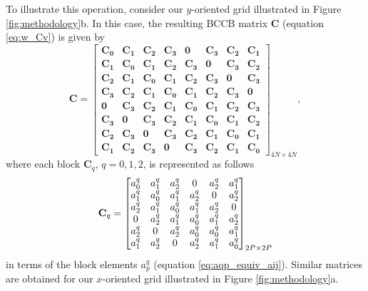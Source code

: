 To illustrate this operation, consider our $y$-oriented grid illustrated in Figure \ref{fig:methodology}b. 
In this case, the resulting 
BCCB matrix $\mathbf{C}$ (equation \ref{eq:w_Cv}) is given by 
\begin{equation}
\mathbf{C} =
\begin{bmatrix}
	\mathbf{C_{0}} & \mathbf{C_{1}} & \mathbf{C_{2}} & \mathbf{C_{3}} & \mathbf{0}     & \mathbf{C_{3}} & \mathbf{C_{2}} & \mathbf{C_{1}} \\
	\mathbf{C_{1}} & \mathbf{C_{0}} & \mathbf{C_{1}} & \mathbf{C_{2}} & \mathbf{C_{3}} & \mathbf{0}     & \mathbf{C_{3}} & \mathbf{C_{2}} \\
	\mathbf{C_{2}} & \mathbf{C_{1}} & \mathbf{C_{0}} & \mathbf{C_{1}} & \mathbf{C_{2}} & \mathbf{C_{3}} & \mathbf{0}     & \mathbf{C_{3}} \\
	\mathbf{C_{3}} & \mathbf{C_{2}} & \mathbf{C_{1}} & \mathbf{C_{0}} & \mathbf{C_{1}} & \mathbf{C_{2}} & \mathbf{C_{3}} & \mathbf{0}     \\
	\mathbf{0}     & \mathbf{C_{3}} & \mathbf{C_{2}} & \mathbf{C_{1}} & \mathbf{C_{0}} & \mathbf{C_{1}} & \mathbf{C_{2}} & \mathbf{C_{3}} \\
	\mathbf{C_{3}} & \mathbf{0}     & \mathbf{C_{3}} & \mathbf{C_{2}} & \mathbf{C_{1}} & \mathbf{C_{0}} & \mathbf{C_{1}} & \mathbf{C_{2}} \\
	\mathbf{C_{2}} & \mathbf{C_{3}} & \mathbf{0}     & \mathbf{C_{3}} & \mathbf{C_{2}} & \mathbf{C_{1}} & \mathbf{C_{0}} & \mathbf{C_{1}} \\
	\mathbf{C_{1}} & \mathbf{C_{2}} & \mathbf{C_{3}} & \mathbf{0}     & \mathbf{C_{3}} & \mathbf{C_{2}} & \mathbf{C_{1}} & \mathbf{C_{0}}
\end{bmatrix}_{4N \times 4N},
\label{eq:C-y-oriented}
\end{equation}
where each block $\mathbf{C}_{q}$, $q = 0, 1, 2$, is represented as follows 
\begin{equation}
\tensor{C}_{q} =
\begin{bmatrix}
	a^{q}_{0} & a^{q}_{1} & a^{q}_{2} & 0         & a^{q}_{2} & a^{q}_{1} \\
	a^{q}_{1} & a^{q}_{0} & a^{q}_{1} & a^{q}_{2} & 0         & a^{q}_{2} \\
	a^{q}_{2} & a^{q}_{1} & a^{q}_{0} & a^{q}_{1} & a^{q}_{2} & 0         \\
	0         & a^{q}_{2} & a^{q}_{1} & a^{q}_{0} & a^{q}_{1} & a^{q}_{2} \\
	a^{q}_{2} & 0         & a^{q}_{2} & a^{q}_{0} & a^{q}_{0} & a^{q}_{1} \\
	a^{q}_{1} & a^{q}_{2} & 0         & a^{q}_{2} & a^{q}_{1} & a^{q}_{0}
\end{bmatrix}_{2P \times 2P}
\label{eq:Cq-y-oriented}
\end{equation}
in terms of the block elements $a^{q}_{p}$ (equation \ref{eq:aqp_equiv_aij}).
Similar matrices are obtained for our $x$-oriented grid illustrated in Figure \ref{fig:methodology}a.

